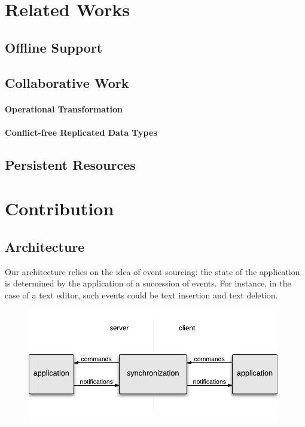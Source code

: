 \documentclass{acm_proc_article-sp}
\begin{document}
\section{Related Works}

\subsection{Offline Support}

\subsection{Collaborative Work}

\paragraph{Operational Transformation}

\paragraph{Conflict-free Replicated Data Types}

\subsection{Persistent Resources}

\section{Contribution}

\subsection{Architecture}

Our architecture relies on the idea of event sourcing: the state of the application is determined by the application of a succession of events. For instance, in the case of a text editor, such events could be text insertion and text deletion.

\begin{figure}
\centering
\includegraphics[width=11cm]{arch-overview.pdf}
\label{fig-arch}
\end{figure}
\end{document}
